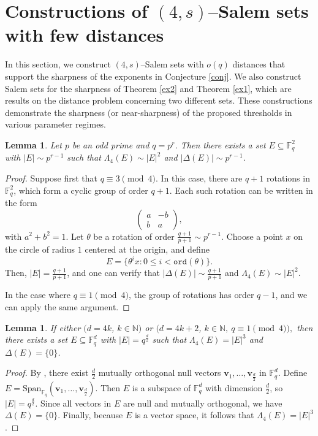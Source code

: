 \documentclass[11pt]{article}
\newtheorem{lemma}[theorem]{Lemma}
\begin{document}
\section{Constructions of $(4, s)$--Salem sets with few distances}\label{constructions}
In this section, we construct $(4, s)$--Salem sets with $o(q)$ distances that support the sharpness of the exponents in Conjecture \ref{conj}. 
We  also construct Salem sets for the sharpness of Theorem \ref{ex2} and Theorem \ref{ex1}, which are results on the distance problem concerning two different sets. 
These constructions demonstrate the sharpness (or near-sharpness) of the proposed thresholds in various parameter regimes.
\begin{lemma}\label{lem-1}
	Let $p$ be an odd prime and $q=p^r$. Then there exists a set $E\subseteq\mathbb{F}_q^2$ with $|E|\sim p^{r-1}$ such that $\Lambda_4(E)\sim|E|^2$ and $|\Delta(E)|\sim p^{r-1}$.
\end{lemma}
\begin{proof}
	Suppose first that $q\equiv 3\pmod 4$. In this case, there are $q+1$ rotations in $\mathbb{F}_q^2$, which form a cyclic group of order $q+1$. Each such rotation can be written in the form 
\[
\begin{pmatrix} a & -b \\ b & a \end{pmatrix},
\]	
with $a^2+b^2=1$. 
	Let $\theta$ be a rotation of order $\frac{q+1}{p+1}\sim p^{r-1}$. Choose a point $x$ on the circle of radius $1$ centered at the origin, and define
	\[
    E=\{\theta^i x\colon 0\le i< \mathtt{ord}(\theta)\}.
    \]
Then, $|E|=\frac{q+1}{p+1}$, and one can verify that $|\Delta(E)|\sim \frac{q+1}{p+1}$ and $\Lambda_4(E)\sim |E|^2$.

In the case where  $q\equiv 1 \pmod{4}$,  the group of rotations has order $q-1$, and we can apply the same argument.
\end{proof}

\begin{lemma}\label{lem-2}
    If either $(d=4k$, $k \in \mathbb{N})$ or $(d=4k+2$, $k \in \mathbb{N}, ~q \equiv 1 \pmod {4}),$  then there exists a set $E\subseteq\mathbb{F}_q^d$ with $|E|=q^{\frac{d}{2}}$ such that $\Lambda_4(E)=|E|^3$ and $\Delta(E)=\{0\}$.
\end{lemma}
\begin{proof}
	By \cite[Lemma 5.1]{HIKR11}, there exist $\frac{d}{2}$ mutually orthogonal null vectors $\mathbf{v}_1,\dots, \mathbf{v}_{\frac{d}{2}}$ in $\mathbb{F}_q^d$. Define $E=\text{Span}_{\mathbb{F}_q}(\mathbf{v}_1,\dots, \mathbf{v}_{\frac{d}{2}})$. Then $E$ is a subspace of $\mathbb{F}_q^d$ with dimension $\frac{d}{2}$, so $|E|=q^{\frac{d}{2}}$. Since all vectors in $E$ are null and mutually orthogonal, we have $\Delta(E)=\{0\}$. Finally, because $E$ is a vector space, it follows that $\Lambda_4(E)=|E|^3$.
\end{proof}
\end{document}
